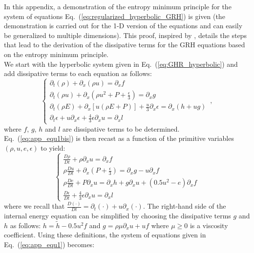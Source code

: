 \documentclass[review]{elsarticle}
\newcommand{\eqt}[1]{Eq.~(\ref{#1})}                     %
\newcommand{\matder}[1]{\frac{D #1}{Dt}}
\begin{document}
\begin{appendices}
In this appendix, a demonstration of the entropy minimum principle for the system of equations \eqt{eq:regularized_hyperbolic_GRH} is given (the demonstration is carried out for the 1-D version of the equations and can easily be generalized to multiple dimensions). This proof, inspired by \cite{jlg}, details the steps that lead to the derivation of the dissipative terms for the GRH equations based on the entropy minimum principle.\\
We start with the hyperbolic system given in \eqt{eq:GHR_hyperbolic} and add dissipative terms to each equation as follows:
\begin{equation}
\label{eq:app_equ1bis}
\left\{
\begin{array}{llll}
\partial_t (\rho  ) + \partial_x (\rho u)  = \partial_x f \\
\partial_t (\rho u) + \partial_x \left(\rho u^2 +  P + \frac{\epsilon}{3} \right) = \partial_x g  \\
\partial_t (\rho E) + \partial_x \left[ u \left( \rho E +P \right) \right] + \frac{u}{3} \partial_x \epsilon = \partial_x \left( h + ug \right) \\
\partial_t \epsilon + u \partial_x \epsilon + \frac{4}{3} \epsilon \partial_x u = \partial_x l
\end{array}
\right. \,,
\end{equation}
where $f$, $g$, $h$ and $l$ are dissipative terms to be determined.
\eqt{eq:app_equ1bis} is then recast as a function of the primitive variables $(\rho, u, e, \epsilon)$ to yield:
\begin{equation}
\label{eq:app_equ1}
\left\{
\begin{array}{llll}
\frac{D \rho}{Dt} + \rho \partial_x u = \partial_x f \\
\rho \frac{Du}{Dt} + \partial_x \left( P + \frac{\epsilon}{3} \right) = \partial_x g - u \partial_x f  \\
\rho \frac{De}{Dt} + P \partial_x u = \partial_x h + g \partial_x u + \left( 0.5 u^2 - e \right) \partial_x f \\
\frac{D\epsilon}{Dt} + \frac{4}{3} \epsilon \partial_x u = \partial_x l
\end{array}
\right. 
\end{equation}
where we recall that $\matder{(\cdot)} = \partial_t (\cdot) + u \partial_x (\cdot)$. 
The right-hand side of the internal energy equation can be simplified by choosing the dissipative terms $g$ and $h$ as follows: $h = \tilde{h} -0.5 u^2 f$ and $g = \rho \mu \partial_x u + uf$ where $\mu \geq 0$ is a viscosity coefficient. Using these definitions, the system of equations given in \eqt{eq:app_equ1} becomes:

\end{appendices}
\end{document}
